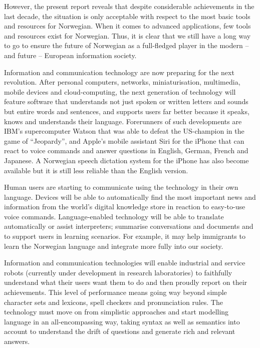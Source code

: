 \begin{multicols}{2}
However, the present report reveals that despite considerable achievements in the last decade, the situation is only acceptable with respect to the most basic tools and resources for Norwegian. When it comes to advanced applications, few tools and resources exist for Norwegian. Thus, it is clear that we still have a long way to go to ensure the future of Norwegian as a full-fledged player in the modern -- and future -- European information society. 

Information and communication technology are now preparing for the next revolution. After personal computers, networks, miniaturisation, multimedia, mobile devices and cloud-computing, the next generation of technology will feature software that understands not just spoken or written letters and sounds but entire words and sentences, and supports users far better because it speaks, knows and understands their language. Forerunners of such developments are IBM’s supercomputer Watson that was able to defeat the US-champion in the game of “Jeopardy”, and Apple’s mobile assistant Siri for the iPhone that can react to voice commands and answer questions in English, German, French and Japanese. A Norwegian speech dictation system for the iPhone has also become available but it is still less reliable than the English version.

Human users are starting to communicate using the technology in their own language. Devices will be able to automatically find the most important news and information from the world’s digital knowledge store in reaction to easy-to-use voice commands. Language-enabled technology will be able to translate automatically or assist interpreters; summarise conversations and documents and to support users in learning scenarios. For example, it may help immigrants to learn the Norwegian language and integrate more fully into our society.
 
Information and communication technologies will enable industrial and service robots (currently under development in research laboratories) to faithfully understand what their users want them to do and then proudly report on their achievements. This level of performance means going way beyond simple character sets and lexicons, spell checkers and pronunciation rules. The technology must move on from simplistic approaches and start modelling language in an all-encompassing way, taking syntax as well as semantics into account to understand the drift of questions and generate rich and relevant answers.


\end{multicols}
